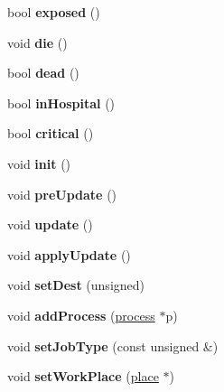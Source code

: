 \begin{DoxyCompactItemize}
\mbox{\label{classagent_a2a92e38a01bd4c7e03747a3a35d741a0}} 
bool {\bfseries exposed} ()
\item 
\mbox{\label{classagent_a3c31fe2f6f752a35261041b5bef3c532}} 
void {\bfseries die} ()
\item 
\mbox{\label{classagent_a9b9b71b861f9074017a73128c098ef7d}} 
bool {\bfseries dead} ()
\item 
\mbox{\label{classagent_ac10f380bcc7416f6b2dacaab82d6c7ed}} 
bool {\bfseries in\+Hospital} ()
\item 
\mbox{\label{classagent_a8da7d990a32c8b88ce57288b4ddb9dac}} 
bool {\bfseries critical} ()
\item 
\mbox{\label{classagent_a9b33e19cdc7822f578dd3ea84ae4247b}} 
void {\bfseries init} ()
\item 
\mbox{\label{classagent_a62677fb1d4e4cb968f297654a34bb2e9}} 
void {\bfseries pre\+Update} ()
\item 
\mbox{\label{classagent_ae20b0b8a169fb7a459c7b195bb970d80}} 
void {\bfseries update} ()
\item 
\mbox{\label{classagent_a30fdee285896c4918428d8713eb9f8b7}} 
void {\bfseries apply\+Update} ()
\item 
\mbox{\label{classagent_a4474a96ab84b2f4285d672142ac255d8}} 
void {\bfseries set\+Dest} (unsigned)
\item 
\mbox{\label{classagent_ab29f844fd10dbcd22271dc49da13970c}} 
void {\bfseries add\+Process} (\mbox{\hyperlink{classprocess}{process}} $\ast$p)
\item 
\mbox{\label{classagent_a89e017002b8df70ed9ccac07f7335f1a}} 
void {\bfseries set\+Job\+Type} (const unsigned \&)
\item 
\mbox{\label{classagent_a580f51ad01e693343049bc65e37eb319}} 
void {\bfseries set\+Work\+Place} (\mbox{\hyperlink{classplace}{place}} $\ast$)

\end{DoxyCompactItemize}
